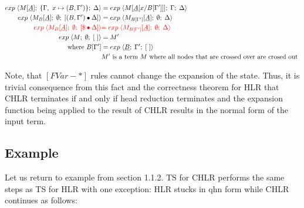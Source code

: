 \documentclass[a4paper, 10pt]{article}
\begin{document}
\begin{align}
  \label{exp11} exp\; \langle M[\underline{A}];\; \{\Gamma,\ x \mapsto (B, \Gamma')\};\; \Delta \rangle
  &= exp\; \langle M[\underline{A}[x / B[\Gamma']]];\; \Gamma;\; \Delta \rangle \\
  \label{exp12} exp\; \langle M_B[\underline{A}];\; \emptyset;\; [(B,\Gamma')\bullet\Delta] \rangle
  &= exp\; \langle M_{B[\Gamma']}[\underline{A}];\; \emptyset;\; \Delta \rangle\\
  \label{exp13}  {\color{red} exp\; \langle M_B[\underline{A}];\; \emptyset;\;  [\$ \bullet \Delta] \rangle}
  &{\color{red}= exp\; \langle M_{B[\Gamma']}[\underline{A}];\; \emptyset;\; \Delta \rangle } \\
  \label{exp14} exp\; \langle M;\; \emptyset;\; [\ ] \rangle &= M' \\
  \textnormal{where } B[\Gamma'] &= exp\; \langle \underline{B};\; \Gamma';\; [\ ] \rangle \\
  & M' \textnormal{ is a term } M \textnormal{ where all nodes that are crossed over are crosed out }
\end{align}

Note, that $[FVar-*]$ rules cannot change the expansion of the state.
Thus, it is trivial consequence from this fact and  the correctness theorem for HLR that
CHLR terminates if and only if head reduction terminates and the expansion function being applied to
the result of CHLR results in the normal form of the input term.


\subsection{Example}
Let us return to example from section 1.1.2. TS for CHLR performs the same steps as TS for HLR
with one exception: HLR stucks in qhn form while CHLR continues as follows:
\end{document}
